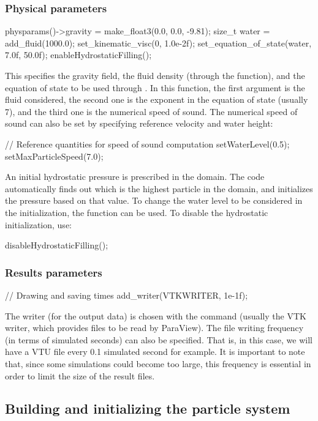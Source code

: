 \documentclass{../GPUSPHtemplate}
\begin{document}
\subsubsection{Physical parameters}
\begin{ccode}
physparams()->gravity = make_float3(0.0, 0.0, -9.81);
size_t water = add_fluid(1000.0);
set_kinematic_visc(0, 1.0e-2f);
set_equation_of_state(water, 7.0f, 50.0f);
enableHydrostaticFilling();
\end{ccode} 
This specifies the gravity field, the fluid density 
(through the  function),
and the equation of state to be used through .
In this function, the first argument is the fluid considered,
the second one is the exponent in the equation of state (usually 7),
and the third one is the numerical speed of sound.
The numerical speed of sound can also be set by specifying reference
velocity and water height:
\begin{ccode}
// Reference quantities for speed of sound computation
setWaterLevel(0.5);
setMaxParticleSpeed(7.0);
\end{ccode} 
An initial hydrostatic pressure is prescribed in the domain.
The code automatically finds out which is the highest
particle in the domain, and initializes the pressure based on that value.
To change the water level to be considered in the initialization, the function
 can be used. To disable the hydrostatic initialization, use:
\begin{ccode}
disableHydrostaticFilling();
\end{ccode} 

\subsubsection{Results parameters}
\begin{ccode}
  // Drawing and saving times
  add_writer(VTKWRITER, 1e-1f);
\end{ccode} 
The writer (for the output data) is chosen with the 
command (usually the VTK writer, which provides files to be read by ParaView).  
The file writing frequency (in terms of simulated seconds) can also be specified. 
That is, in this case, we will have a VTU file every 0.1 simulated second for example. 
It is important to note that, since some simulations could become 
too large, this frequency is essential in order to limit the size of the result files.


\subsection{Building and initializing the particle system}
\end{document}
